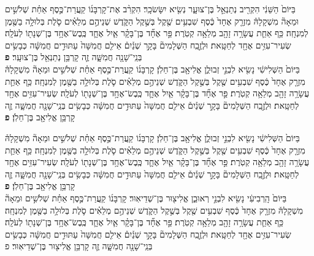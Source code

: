 \documentclass[twoside, openany, parskip=half, 11pt]{book}
\begin{document}
\begin{footnotesize}
\begin{multicols}{2}
בַּיּוֹם֙ הַשֵּׁנִ֔י הִקְרִ֖יב נְתַנְאֵ֣ל בֶּן־צוּעָ֑ר נְשִׂ֖יא יִשָּׂשׂכָֽר׃ הִקְרִ֨ב אֶת־קָרְבָּנ֜וֹ קַֽעֲרַת־כֶּ֣סֶף אַחַ֗ת שְׁלֹשִׁ֣ים וּמֵאָה֘ מִשְׁקָלָהּ֒ מִזְרָ֤ק אֶחָד֙ כֶּ֔סֶף שִׁבְעִ֥ים שֶׁ֖קֶל בְּשֶׁ֣קֶל הַקֹּ֑דֶשׁ שְׁנֵיהֶ֣ם מְלֵאִ֗ים סֹ֛לֶת בְּלוּלָ֥ה בַשֶּׁ֖מֶן לְמִנְחָֽה׃ כַּ֥ף אַחַ֛ת עֲשָׂרָ֥ה זָהָ֖ב מְלֵאָ֥ה קְטֹֽרֶת׃    פַּ֣ר אֶחָ֞ד בֶּן־בָּקָ֗ר אַ֧יִל אֶחָ֛ד כֶּֽבֶשׂ־אֶחָ֥ד בֶּן־שְׁנָת֖וֹ לְעֹלָֽה׃ שְׂעִיר־עִזִּ֥ים אֶחָ֖ד לְחַטָּֽאת׃ וּלְזֶ֣בַֽח הַשְּׁלָמִים֘ בָּקָ֣ר שְׁנַ֒יִם֒ אֵילִ֤ם חֲמִשָּׁה֙ עַתּוּדִ֣ים חֲמִשָּׁ֔ה כְּבָשִׂ֥ים בְּנֵֽי־שָׁנָ֖ה חֲמִשָּׁ֑ה זֶ֛ה קָרְבַּ֥ן נְתַנְאֵ֖ל בֶּן־צוּעָֽר׃ \textbf{פ} \\ 
בַּיּוֹם֙ הַשְּׁלִישִׁ֔י נָשִׂ֖יא לִבְנֵ֣י זְבוּלֻ֑ן אֱלִיאָ֖ב בֶּן־חֵלֹֽן׃ קָרְבָּנ֜וֹ קַֽעֲרַת־כֶּ֣סֶף אַחַ֗ת שְׁלֹשִׁ֣ים וּמֵאָה֘ מִשְׁקָלָהּ֒ מִזְרָ֤ק אֶחָד֙ כֶּ֔סֶף שִׁבְעִ֥ים שֶׁ֖קֶל בְּשֶׁ֣קֶל הַקֹּ֑דֶשׁ שְׁנֵיהֶ֣ם מְלֵאִ֗ים סֹ֛לֶת בְּלוּלָ֥ה בַשֶּׁ֖מֶן לְמִנְחָֽה׃ כַּ֥ף אַחַ֛ת עֲשָׂרָ֥ה זָהָ֖ב מְלֵאָ֥ה קְטֹֽרֶת׃ פַּ֣ר אֶחָ֞ד בֶּן־בָּקָ֗ר אַ֧יִל אֶחָ֛ד כֶּֽבֶשׂ־אֶחָ֥ד בֶּן־שְׁנָת֖וֹ לְעֹלָֽה׃ שְׂעִיר־עִזִּ֥ים אֶחָ֖ד לְחַטָּֽאת׃ וּלְזֶ֣בַֽח הַשְּׁלָמִים֘ בָּקָ֣ר שְׁנַ֒יִם֒ אֵילִ֤ם חֲמִשָּׁה֙ עַתּוּדִ֣ים חֲמִשָּׁ֔ה כְּבָשִׂ֥ים בְּנֵֽי־שָׁנָ֖ה חֲמִשָּׁ֑ה זֶ֛ה קָרְבַּ֥ן אֱלִיאָ֖ב בֶּן־חֵלֹֽן׃ \textbf{פ} 


בַּיּוֹם֙ הַשְּׁלִישִׁ֔י נָשִׂ֖יא לִבְנֵ֣י זְבוּלֻ֑ן אֱלִיאָ֖ב בֶּן־חֵלֹֽן׃ קָרְבָּנ֜וֹ קַֽעֲרַת־כֶּ֣סֶף אַחַ֗ת שְׁלֹשִׁ֣ים וּמֵאָה֘ מִשְׁקָלָהּ֒ מִזְרָ֤ק אֶחָד֙ כֶּ֔סֶף שִׁבְעִ֥ים שֶׁ֖קֶל בְּשֶׁ֣קֶל הַקֹּ֑דֶשׁ שְׁנֵיהֶ֣ם מְלֵאִ֗ים סֹ֛לֶת בְּלוּלָ֥ה בַשֶּׁ֖מֶן לְמִנְחָֽה׃ כַּ֥ף אַחַ֛ת עֲשָׂרָ֥ה זָהָ֖ב מְלֵאָ֥ה קְטֹֽרֶת׃   פַּ֣ר אֶחָ֞ד בֶּן־בָּקָ֗ר אַ֧יִל אֶחָ֛ד כֶּֽבֶשׂ־אֶחָ֥ד בֶּן־שְׁנָת֖וֹ לְעֹלָֽה׃ שְׂעִיר־עִזִּ֥ים אֶחָ֖ד לְחַטָּֽאת׃ וּלְזֶ֣בַֽח הַשְּׁלָמִים֘ בָּקָ֣ר שְׁנַ֒יִם֒ אֵילִ֤ם חֲמִשָּׁה֙ עַתּוּדִ֣ים חֲמִשָּׁ֔ה כְּבָשִׂ֥ים בְּנֵֽי־שָׁנָ֖ה חֲמִשָּׁ֑ה זֶ֛ה קָרְבַּ֥ן אֱלִיאָ֖ב בֶּן־חֵלֹֽן׃ \textbf{פ} \\
  בַּיּוֹם֙ הָֽרְבִיעִ֔י נָשִׂ֖יא לִבְנֵ֣י רְאוּבֵ֑ן אֱלִיצ֖וּר בֶּן־שְׁדֵיאֽוּר׃ קָרְבָּנ֜וֹ קַֽעֲרַת־כֶּ֣סֶף אַחַ֗ת שְׁלֹשִׁ֣ים וּמֵאָה֘ מִשְׁקָלָהּ֒ מִזְרָ֤ק אֶחָד֙ כֶּ֔סֶף שִׁבְעִ֥ים שֶׁ֖קֶל בְּשֶׁ֣קֶל הַקֹּ֑דֶשׁ שְׁנֵיהֶ֣ם מְלֵאִ֗ים סֹ֛לֶת בְּלוּלָ֥ה בַשֶּׁ֖מֶן לְמִנְחָֽה׃ כַּ֥ף אַחַ֛ת עֲשָׂרָ֥ה זָהָ֖ב מְלֵאָ֥ה קְטֹֽרֶת׃ פַּ֣ר אֶחָ֞ד בֶּן־בָּקָ֗ר אַ֧יִל אֶחָ֛ד כֶּֽבֶשׂ־אֶחָ֥ד בֶּן־שְׁנָת֖וֹ לְעֹלָֽה׃ שְׂעִיר־עִזִּ֥ים אֶחָ֖ד לְחַטָּֽאת׃ וּלְזֶ֣בַֽח הַשְּׁלָמִים֘ בָּקָ֣ר שְׁנַ֒יִם֒ אֵילִ֤ם חֲמִשָּׁה֙ עַתּוּדִ֣ים חֲמִשָּׁ֔ה כְּבָשִׂ֥ים בְּנֵֽי־שָׁנָ֖ה חֲמִשָּׁ֑ה זֶ֛ה קָרְבַּ֥ן אֱלִיצ֖וּר בֶּן־שְׁדֵיאֽוּר׃ פ



\end{multicols}
\end{footnotesize}
\end{document}
